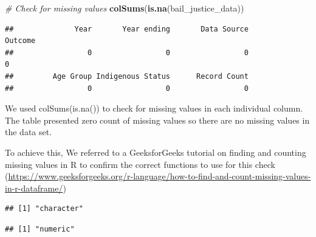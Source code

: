 \documentclass[
]{article}
\newenvironment{Shaded}{\begin{snugshade}}{\end{snugshade}}
\newcommand{\AttributeTok}[1]{\textcolor[rgb]{0.13,0.29,0.53}{#1}}
\newcommand{\CommentTok}[1]{\textcolor[rgb]{0.56,0.35,0.01}{\textit{#1}}}
\newcommand{\FunctionTok}[1]{\textcolor[rgb]{0.13,0.29,0.53}{\textbf{#1}}}
\newcommand{\NormalTok}[1]{#1}
\newcommand{\SpecialCharTok}[1]{\textcolor[rgb]{0.81,0.36,0.00}{\textbf{#1}}}
\newcommand{\StringTok}[1]{\textcolor[rgb]{0.31,0.60,0.02}{#1}}
\begin{document}
\begin{Shaded}
\begin{Highlighting}[]
\CommentTok{\# Check for missing values}
\FunctionTok{colSums}\NormalTok{(}\FunctionTok{is.na}\NormalTok{(bail\_justice\_data))}
\end{Highlighting}
\end{Shaded}

\begin{verbatim}
##              Year       Year ending       Data Source           Outcome 
##                 0                 0                 0                 0 
##         Age Group Indigenous Status      Record Count 
##                 0                 0                 0
\end{verbatim}

We used colSums(is.na()) to check for missing values in each individual
column. The table presented zero count of missing values so there are no
missing values in the data set.

To achieve this, We referred to a GeeksforGeeks tutorial on finding and
counting missing values in R to confirm the correct functions to use for
this check
(\url{https://www.geeksforgeeks.org/r-language/how-to-find-and-count-missing-values-in-r-dataframe/})

\begin{Shaded}
\end{Shaded}

\begin{verbatim}
## [1] "character"
\end{verbatim}

\begin{Shaded}
\end{Shaded}

\begin{verbatim}
## [1] "numeric"
\end{verbatim}

\begin{Shaded}
\end{Shaded}
\end{document}
